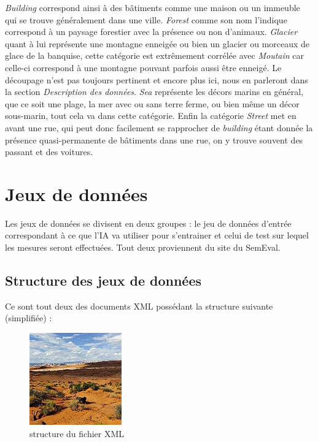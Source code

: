 \documentclass[12pt ,a4paper ]{article}
\begin{document}
\begin{multicols}{2}
\bigskip
\textit{Building} correspond ainsi à des bâtiments comme une maison ou un immeuble qui se trouve généralement dans une ville. \textit{Forest} comme son nom l'indique correspond à un paysage forestier avec la présence ou non d'animaux. 
\textit{Glacier} quant à lui représente une montagne enneigée ou bien un glacier ou morceaux de glace de la banquise, cette catégorie est extrêmement corrélée avec \textit{Moutain} car celle-ci correspond à une montagne pouvant parfois aussi être enneigé. Le découpage n'est pas toujours pertinent et encore plus ici, nous en parleront dans la section \textit{Description des données}. \textit{Sea} représente les décors marins en général, que ce soit une plage, la mer avec ou sans terre ferme, ou bien même un décor sous-marin, tout cela va dans cette catégorie. Enfin la catégorie \textit{Street} met en avant une rue, qui peut donc facilement se rapprocher de \textit{building} étant donnée la présence quasi-permanente de bâtiments dans une rue, on y trouve souvent des passant et des voitures.  

\section{Jeux de données}
Les jeux de données se divisent en deux groupes : le jeu de données d'entrée correspondant à ce que l'IA va utiliser pour s'entrainer et celui de test sur lequel les mesures seront effectuées. Tout deux proviennent du site du SemEval. 

\subsection{Structure des jeux de données}
\noindent Ce sont tout deux des documents XML possédant la structure suivante (simplifiée) :  

\begin{figure}[H]
\begin{center}
\includegraphics[scale=0.55]{3808.jpg}
\caption{\small{structure du fichier XML}}
\end{center}
\end{figure}


\end{multicols}
\end{document}
